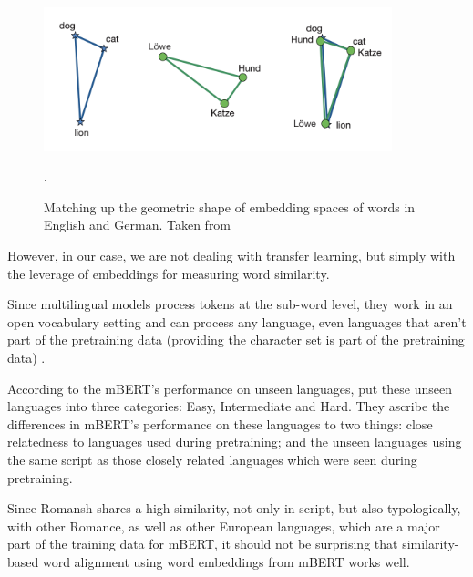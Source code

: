\begin{figure}[ht]
\centering
\includegraphics[width=0.9\textwidth]{graphics/embedding-alignment.png}
\caption[Matching up the geometric shape of embedding spaces of words in English and German]{Matching up the geometric shape of embedding spaces of words in English and German. 
Taken from \cite[223]{koehn-2020}}.
\label{fig:embedding-alignment}
\end{figure}

However, in our case, we are not dealing with transfer learning, but simply with the leverage of embeddings for measuring word similarity. 

Since multilingual models process tokens at the sub-word level, they work in an open vocabulary setting and can process any language, even languages that aren't part of the pretraining data (providing the character set is part of the pretraining data) \autocite{muller-et-al-2020}.

According to the mBERT's performance on unseen languages, \textcite{muller-et-al-2020} put these unseen languages into three categories: Easy, Intermediate and Hard. 
They ascribe the differences in mBERT's performance on these languages to two things: close relatedness to languages used during pretraining; and the unseen languages using the same script as those closely related languages which were seen during pretraining.

Since Romansh shares a high similarity, not only in script, but also typologically, with other Romance, as well as other European languages\footnotemark{}, which are a major part of the training data for mBERT, it should not be surprising that similarity-based word alignment using word embeddings from mBERT works well.





